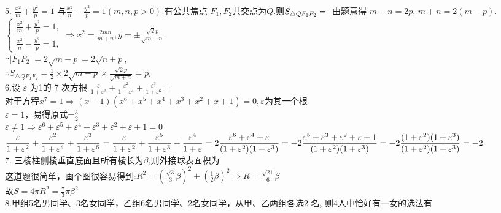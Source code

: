 \documentclass[a4paper,11pt,UTF8]{article}
\begin{document}
5. $\displaystyle\frac{x^2}{m}+\frac{y^2}{p}=1$ 与$ \displaystyle\frac{x^2}{n}-\frac{y^2}{p}=1(m, n, p>0)$ 有公共焦点 $F_1, F_2$共交点为$Q$.则$S_{\triangle Q F_1 F_2}=\\$
由题意得 $m-n=2 p$,  $m+n=2(m-p)$.\\
$\displaystyle\left\{\begin{array}{l}\displaystyle\frac{x^2}{m}+\frac{y^2}{p}=1, \\ \displaystyle\frac{x^2}{n}-\frac{y^2}{p}=1,\end{array}\right.\Rightarrow x^2=\frac{2 m n}{m+n}, y= \pm \frac{\sqrt{2} p}{\sqrt{m+n}}$\\
$\because\displaystyle\left|F_1 F_2\right|=2 \sqrt{m-p}=2 \sqrt{n+p}$,\\
$\therefore\displaystyle S_{\triangle Q F_1 F_2}=\frac{1}{2} \times 2 \sqrt{m-p} \times \frac{\sqrt{2} p}{\sqrt{m+n}}=p$.\\
6.设 $\varepsilon$ 为1的 7 次方根 $\displaystyle\frac{\varepsilon}{1+\varepsilon^2}+\frac{\varepsilon^2}{1+\varepsilon^4}+\frac{\varepsilon^3}{1+\varepsilon^6}=$\\
对于方程$x^7=1\Rightarrow (x-1)(x^6+x^5+x^4+x^3+x^2+x+1)=0,\varepsilon$为其一个根\\
$\varepsilon=1$，易得原式=$\displaystyle\frac{3}{2}$\\
$\varepsilon\neq1\Rightarrow \varepsilon^6+\varepsilon^5+\varepsilon^4+\varepsilon^3+\varepsilon^2+\varepsilon+1=0$\\
$\displaystyle\frac{\varepsilon}{1+\varepsilon^2}+\frac{\varepsilon^2}{1+\varepsilon^4}+\frac{\varepsilon^3}{1+\varepsilon^6}=\displaystyle\frac{\varepsilon}{1+\varepsilon^2}+\frac{\varepsilon^5}{1+\varepsilon^3}+\frac{\varepsilon^4}{1+\varepsilon}=2\frac{\varepsilon^6+\varepsilon^4+\varepsilon}{(1+\varepsilon^2)(1+\varepsilon^3)}\\
=-2\frac{\varepsilon^5+\varepsilon^3+\varepsilon^2+\varepsilon+1}{(1+\varepsilon^2)(1+\varepsilon^3)}=-2\frac{(1+\varepsilon^2)(1+\varepsilon^3)}{(1+\varepsilon^2)(1+\varepsilon^3)}=-2$\\
7. 三棱柱侧棱垂直底面且所有棱长为$\beta$,则外接球表面积为\\
这道题很简单，画个图很容易得到:$\displaystyle R^2=(\frac{\sqrt{3}}{3}\beta)^2+(\frac{1}{2}\beta)^2\Rightarrow R=\frac{\sqrt{21}}{6}\beta$\\
故$\displaystyle S=4\pi R^2=\frac{7}{3}\pi\beta^2$\\
8.甲组5名男同学、3名女同学，乙组6名男同学、2名女同学，从甲、乙两组各选2
名, 则4人中恰好有一女的选法有\\
\end{document}
